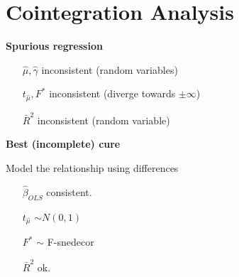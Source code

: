 \section{Cointegration Analysis}
\begin{multicols}{2}\noindent
 \textbf{Spurious regression}
 \begin{itemize}
  \item[$\hat{\mu},\hat{\gamma}$] inconsistent (random variables)
  \item[$t_{\hat{\mu}},F^{*}$] inconsistent (diverge towards $\pm\infty$)
  \item[$\bar{R}^2$] inconsistent (random variable)
 \end{itemize}
 \textbf{Best (incomplete) cure}\par
 Model the relationship using differences
 \begin{itemize}
  \item[$\hat{\beta}_{OLS}$] consistent.
  \item[$t_{\hat{\mu}}$] $\sim N(0,1)$
  \item[$F^{*}$] $\sim$ F-snedecor
  \item[$\bar{R}^2$] ok.
 \end{itemize}


\end{multicols}
